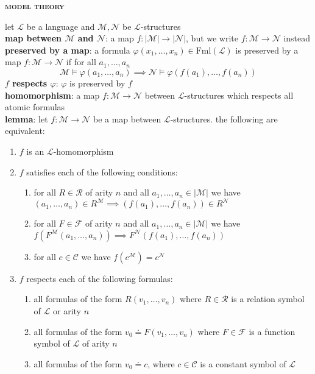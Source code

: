 \documentclass[a4paper]{article}
\newcommand\abs[1]{\ensuremath{\lvert#1\rvert}}
\begin{document}
\begin{framed}
	\begin{center}
		\textbf{\textsc{model theory}}
	\end{center}
	
	\noindent
	let $\mathscr{L}$ be a language and $\mathscr{M}, \mathscr{N}$ be $\mathscr{L}$-structures\\
	
	\noindent
	\textbf{map between $\mathscr{M}$ and $\mathscr{N}$}: a map $f: \abs{\mathscr{M}} \rightarrow \abs{\mathscr{N}}$, but we write $f: \mathscr{M} \rightarrow \mathscr{N}$ instead\\
	\textbf{preserved by a map}: a formula $\varphi(x_1, \dots, x_n) \in \text{Fml}(\mathscr{L})$ is preserved by a map $f: \mathscr{M} \rightarrow \mathscr{N}$ if for all $a_1, \dots, a_n$
	$$\mathscr{M} \models \varphi(a_1, \dots, a_n) \implies \mathscr{N} \models \varphi(f(a_1), \dots, f(a_n))$$
	\textbf{$f$ respects $\varphi$}: $\varphi$ is preserved by $f$\\
	
	\noindent
	\textbf{homomorphism}: a map $f: \mathscr{M} \rightarrow \mathscr{N}$ between $\mathscr{L}$-structures which respects all atomic formulas\\
	\textbf{lemma}: let $f: \mathscr{M} \rightarrow \mathscr{N}$ be a map between $\mathscr{L}$-structures. the following are equivalent:
	\begin{enumerate}[label=(\roman*), itemsep=-3pt, topsep=0pt]
		\item $f$ is an $\mathscr{L}$-homomorphism
		\item $f$ satisfies each of the following conditions:
		\begin{enumerate}[label=(\alph*), itemsep=-2.5pt, topsep=-5pt]
			\item for all $R \in \mathscr{R}$ of arity $n$ and all $a_1, \dots, a_n \in \abs{\mathscr{M}}$ we have $(a_1, \dots, a_n) \in R^\mathscr{M} \implies (f(a_1), \dots, f(a_n)) \in R^\mathscr{N}$
			\item for all $F \in \mathscr{F}$ of arity $n$ and all $a_1, \dots, a_n \in \abs{\mathscr{M}}$ we have $f(F^\mathscr{M}(a_1, \dots, a_n)) \implies F^\mathscr{N}(f(a_1), \dots, f(a_n))$
			\item for all $c \in \mathscr{C}$ we have $f(c^\mathscr{M}) = c^\mathscr{N}$
		\end{enumerate}
		\item $f$ respects each of the following formulas:
		\begin{enumerate}[label=(\alph*), itemsep=-2pt, topsep=-5pt]
			\item all formulas of the form $R(v_1, \dots, v_n)$ where $R \in \mathscr{R}$ is a relation symbol of $\mathscr{L}$ or arity $n$
			\item all formulas of the form $v_0 \doteq F(v_1, \dots, v_n)$ where $F \in \mathscr{F}$ is a function symbol of $\mathscr{L}$ of arity $n$
			\item all formulas of the form $v_0 \doteq c$, where $c \in \mathscr{C}$ is a constant symbol of $\mathscr{L}$\\
		\end{enumerate}
	\end{enumerate}


\end{framed}
\end{document}
